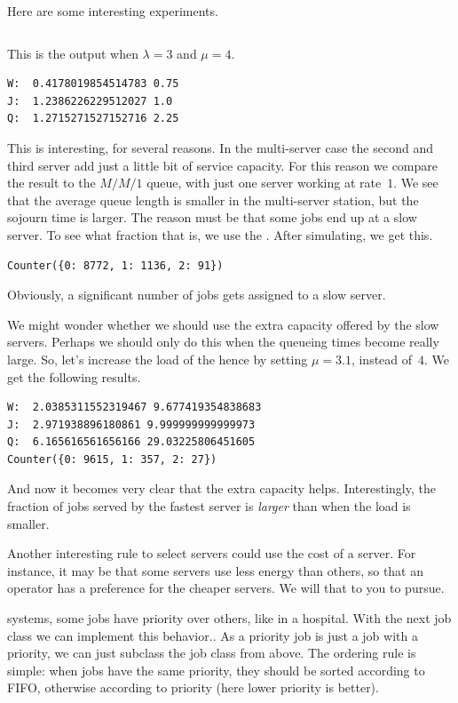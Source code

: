 \documentclass[queueing-book.tex]{subfiles}
\begin{document}
Here are some interesting experiments.
\inputminted[label=multiple-speeds.py]{python}{../code/event_stacks/multiple_speeds.py}
This is the output when $\lambda=3$ and $\mu=4$.
\begin{verbatim}
W:  0.4178019854514783 0.75
J:  1.2386226229512027 1.0
Q:  1.2715271527152716 2.25
\end{verbatim}
This is interesting, for several reasons.
In the multi-server case the second and third server add just a little bit of service capacity.
For this reason we compare the result to the $M/M/1$ queue, with just one server working at rate~$1$.
We see that the average queue length is smaller in the multi-server station, but the sojourn time is larger.
The reason must be that some jobs end up at a slow server.
To see  what fraction that is, we use the . After simulating, we get this.
\begin{verbatim}
Counter({0: 8772, 1: 1136, 2: 91})
\end{verbatim}
Obviously, a significant number of jobs gets assigned to a slow server.

We might wonder whether we should use the extra capacity offered by the slow servers.
Perhaps we should only do this when the queueing times become really large.
So, let's increase the load of the hence by setting $\mu=3.1$, instead of~$4$. We get the following results.
\begin{verbatim}
W:  2.0385311552319467 9.677419354838683
J:  2.971938896180861 9.999999999999973
Q:  6.165616561656166 29.03225806451605
Counter({0: 9615, 1: 357, 2: 27})
\end{verbatim}
And now it becomes very clear that the extra capacity helps. Interestingly, the fraction of jobs served by the fastest server is \emph{larger} than when the load is smaller.

Another interesting rule to select servers could use the cost of a server.
For instance, it may be that some servers use less energy than others, so that an operator has a preference for the cheaper servers.
We will that to you to pursue.

 systems, some jobs have priority over others, like in a hospital.
With the next job class we can implement this behavior..
As a priority job is just a job with a priority, we can just subclass the job class from above.
The ordering rule is simple: when jobs have the same priority, they should be sorted according to FIFO, otherwise according to priority (here lower priority is better).
\inputminted[label=priority-job.py]{python}{../code/event_stacks/priority_job.py}
\end{document}
